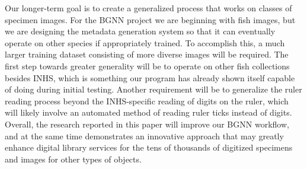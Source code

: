 \documentclass[conference]{IEEEtran}
\begin{document}
Our longer-term goal is to create a generalized process that works on classes of specimen images. For the BGNN project we are beginning with fish images, but we are designing the metadata generation system so that it can eventually operate on other species if appropriately  trained. To accomplish this, a much larger training dataset consisting of more diverse images will be required. The first step towards greater generality will be to operate on other fish collections besides INHS, which is something our program has already
shown itself capable of doing during initial testing. Another requirement will be to generalize the ruler reading process beyond the INHS-specific reading of digits on the ruler, which will likely involve an automated method of reading ruler ticks instead of digits. Overall, the  research reported in this paper will improve our BGNN workflow, and at the same time demonstrates an innovative approach that may greatly enhance digital  library  services for the tens of thousands of digitized specimens and images for other types of objects.




\end{document}
